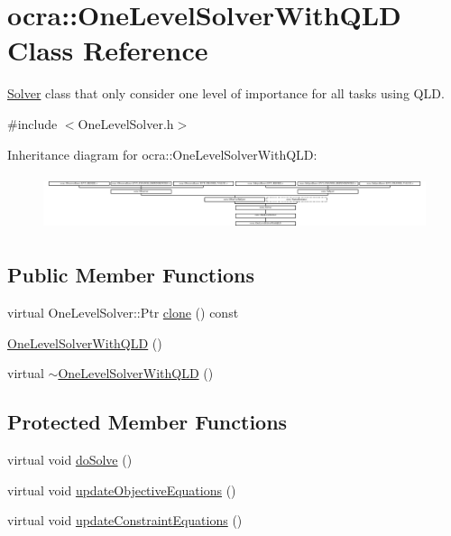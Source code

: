 \hypertarget{classocra_1_1OneLevelSolverWithQLD}{}\section{ocra\+:\+:One\+Level\+Solver\+With\+Q\+LD Class Reference}
\label{classocra_1_1OneLevelSolverWithQLD}


\hyperlink{classocra_1_1Solver}{Solver} class that only consider one level of importance for all tasks using Q\+LD.  




{\ttfamily \#include $<$One\+Level\+Solver.\+h$>$}

Inheritance diagram for ocra\+:\+:One\+Level\+Solver\+With\+Q\+LD\+:\begin{figure}[H]
\begin{center}
\leavevmode
\includegraphics[height=1.623188cm]{df/d1b/classocra_1_1OneLevelSolverWithQLD}
\end{center}
\end{figure}
\subsection*{Public Member Functions}
\begin{DoxyCompactItemize}
\item 
virtual One\+Level\+Solver\+::\+Ptr \hyperlink{classocra_1_1OneLevelSolverWithQLD_a8dc1522a50198d0120de3b29e94d66e8}{clone} () const
\item 
\hyperlink{classocra_1_1OneLevelSolverWithQLD_a75cf75293c527be3cbafb379bcddd758}{One\+Level\+Solver\+With\+Q\+LD} ()
\item 
virtual \hyperlink{classocra_1_1OneLevelSolverWithQLD_aaedebe9fe695e3bca4a9010b88386fcc}{$\sim$\+One\+Level\+Solver\+With\+Q\+LD} ()
\end{DoxyCompactItemize}
\subsection*{Protected Member Functions}
\begin{DoxyCompactItemize}
\item 
virtual void \hyperlink{classocra_1_1OneLevelSolverWithQLD_ac7cce5bd375142ca0c74cd71300b15a5}{do\+Solve} ()
\item 
virtual void \hyperlink{classocra_1_1OneLevelSolverWithQLD_a23556b4af1bdbead4ecb242991dbd175}{update\+Objective\+Equations} ()
\item 
virtual void \hyperlink{classocra_1_1OneLevelSolverWithQLD_abc304c0e5f9234ca4230f7b67b02a0c0}{update\+Constraint\+Equations} ()
\end{DoxyCompactItemize}
